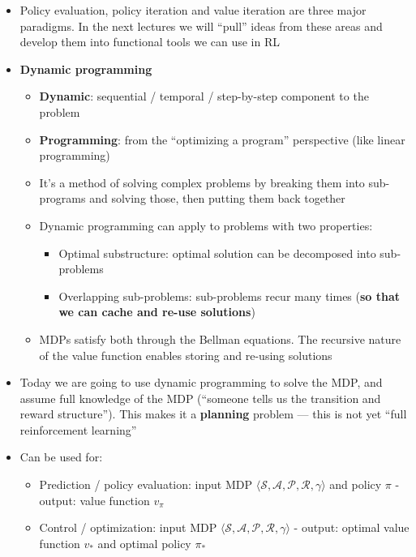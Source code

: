 \documentclass{article}
\begin{document}
\begin{itemize}
    \item Policy evaluation, policy iteration and value iteration are three major paradigms. In the next lectures we will ``pull'' ideas from these areas and develop them into functional tools we can use in RL
    \item \textbf{Dynamic programming}
        \begin{itemize}
            \item \textbf{Dynamic}: sequential / temporal / step-by-step component to the problem
            \item \textbf{Programming}: from the ``optimizing a program'' perspective (like linear programming)
            \item It's a method of solving complex problems by breaking them into sub-programs and solving those, then putting them back together
        \item Dynamic programming can apply to problems with two properties:
        \begin{itemize}
            \item Optimal substructure: optimal solution can be decomposed into sub-problems
            \item Overlapping sub-problems: sub-problems recur many times (\textbf{so that we can cache and re-use solutions})
        \end{itemize}
        \item MDPs satisfy both through the Bellman equations. The recursive nature of the value function enables storing and re-using solutions
    \end{itemize}
    \item Today we are going to use dynamic programming to solve the MDP, and assume full knowledge of the MDP (``someone tells us the transition and reward structure''). This makes it a \textbf{planning} problem --- this is not yet ``full reinforcement learning''
    \item Can be used for:
    \begin{itemize}
        \item Prediction / policy evaluation: input MDP $\langle\mathcal{S}, \mathcal{A}, \mathcal{P}, \mathcal{R}, \gamma \rangle$ and policy $\pi$ - output: value function $v_\pi$
        \item Control / optimization: input MDP $\langle\mathcal{S}, \mathcal{A}, \mathcal{P}, \mathcal{R}, \gamma \rangle$ - output: optimal value function $v_*$ and optimal policy $\pi_*$
    \end{itemize}
\end{itemize}
\end{document}

